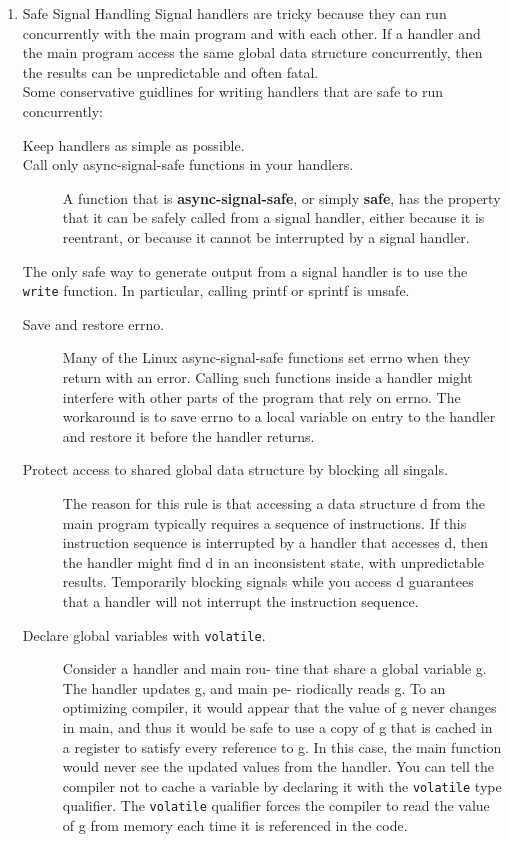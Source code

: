 \documentclass[11pt]{article}
\begin{document}
\begin{enumerate}
\item Safe Signal Handling
\label{sec:orgdb19247}
Signal handlers are tricky because they can run concurrently with the main program and with each other. If a handler and the main program access the same global data structure concurrently, then the results can be unpredictable and often fatal.\\

Some conservative guidlines for writing handlers that are safe to run concurrently:\\
\begin{description}
\item[{Keep handlers as simple as possible.}] 

\item[{Call only async-signal-safe functions in your handlers.}] A function that is \textbf{async-signal-safe}, or simply \textbf{safe}, has the property that it can be safely called from a signal handler, either because it is reentrant, or because it cannot be interrupted by a signal handler.\\
\end{description}
The only safe way to generate output from a signal handler is to use the \texttt{write} function. In particular, calling printf or sprintf is unsafe.\\
\begin{description}
\item[{Save and restore errno.}] Many of the Linux async-signal-safe functions set errno when they return with an error. Calling such functions inside a handler might interfere with other parts of the program that rely on errno. The workaround is to save errno to a local variable on entry to the handler and restore it before the handler returns.\\
\item[{Protect access to shared global data structure by blocking all singals.}] The reason for this rule is that accessing a data structure d from the main program typically requires a sequence of instructions. If this instruction sequence is interrupted by a handler that accesses d, then the handler might find d in an inconsistent state, with unpredictable results. Temporarily blocking signals while you access d guarantees that a handler will not interrupt the instruction sequence.\\
\item[{Declare global variables with \texttt{volatile}.}] Consider a handler and main rou- tine that share a global variable g. The handler updates g, and main pe- riodically reads g. To an optimizing compiler, it would appear that the value of g never changes in main, and thus it would be safe to use a copy of g that is cached in a register to satisfy every reference to g. In this case, the main function would never see the updated values from the handler. You can tell the compiler not to cache a variable by declaring it with the \texttt{volatile} type qualifier. The \texttt{volatile} qualifier forces the compiler to read the value of g from memory each time it is referenced in the code.\\

\end{description}
\end{enumerate}
\end{document}

